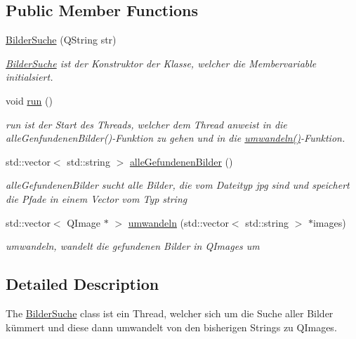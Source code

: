 \subsection*{Public Member Functions}
\begin{DoxyCompactItemize}
\item 
\hyperlink{class_bilder_suche_a97b3d540614ea2dfe1156cbd5329c5c2}{Bilder\+Suche} (Q\+String str)
\begin{DoxyCompactList}\small\item\em \hyperlink{class_bilder_suche}{Bilder\+Suche} ist der Konstruktor der Klasse, welcher die Membervariable initialsiert. \end{DoxyCompactList}\item 
void \hyperlink{class_bilder_suche_a2765934cad34852137d016498d4df67b}{run} ()\hypertarget{class_bilder_suche_a2765934cad34852137d016498d4df67b}{}\label{class_bilder_suche_a2765934cad34852137d016498d4df67b}

\begin{DoxyCompactList}\small\item\em run ist der Start des Threads, welcher dem Thread anweist in die alle\+Genfundenen\+Bilder()-\/\+Funktion zu gehen und in die \hyperlink{class_bilder_suche_abbe9b5b791ce40ad31a79c9e005170ec}{umwandeln()}-\/\+Funktion. \end{DoxyCompactList}\item 
std\+::vector$<$ std\+::string $>$ \hyperlink{class_bilder_suche_a44524a24668f41bd6b3cf1b3bedb9529}{alle\+Gefundenen\+Bilder} ()
\begin{DoxyCompactList}\small\item\em alle\+Gefundenen\+Bilder sucht alle Bilder, die vom Dateityp jpg sind und speichert die Pfade in einem Vector vom Typ string \end{DoxyCompactList}\item 
std\+::vector$<$ Q\+Image $\ast$ $>$ \hyperlink{class_bilder_suche_abbe9b5b791ce40ad31a79c9e005170ec}{umwandeln} (std\+::vector$<$ std\+::string $>$ $\ast$images)
\begin{DoxyCompactList}\small\item\em umwandeln, wandelt die gefundenen Bilder in Q\+Images um \end{DoxyCompactList}\end{DoxyCompactItemize}


\subsection{Detailed Description}
The \hyperlink{class_bilder_suche}{Bilder\+Suche} class ist ein Thread, welcher sich um die Suche aller Bilder kümmert und diese dann umwandelt von den bisherigen Strings zu Q\+Images. 

